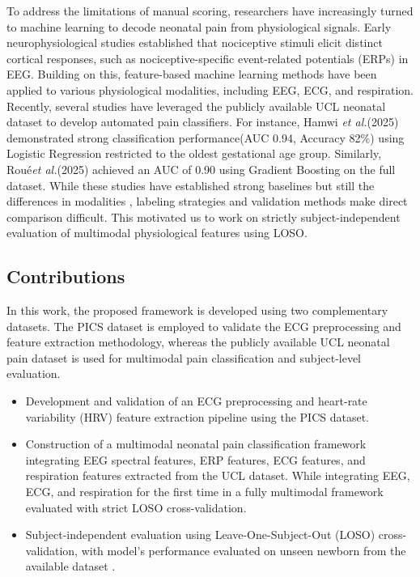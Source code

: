 \documentclass[conference]{IEEEtran}
\begin{document}
To address the limitations of manual scoring, researchers have increasingly turned to machine learning to decode neonatal pain from physiological signals. Early neurophysiological studies established that nociceptive stimuli elicit distinct cortical responses, such as nociceptive-specific event-related potentials (ERPs) in EEG. Building on this, feature-based machine learning methods have been applied to various physiological modalities, including EEG, ECG, and respiration.
Recently, several studies have leveraged the publicly available UCL neonatal dataset to develop automated pain classifiers. For instance, Hamwi \textit{et al.}(2025)\cite{hamwi2025eeg} demonstrated strong classification performance(AUC 0.94, Accuracy 82\%) using Logistic Regression restricted to the oldest gestational age group. Similarly, Roué\textit{et al.}(2025)\cite{roue2025objective} achieved an AUC of 0.90 using Gradient Boosting on the full dataset. While these studies have established strong baselines but still the differences in modalities , labeling strategies and validation methods make direct comparison difficult. This motivated us to work on strictly subject-independent evaluation of multimodal physiological features using LOSO.

\subsection{Contributions}
In this work, the proposed framework is developed using two complementary datasets. The PICS dataset is employed to validate the ECG preprocessing and feature extraction methodology, whereas the publicly available UCL neonatal pain dataset is used for multimodal pain classification and subject-level evaluation.
\begin{itemize}

\item Development and validation of an ECG preprocessing and heart-rate variability (HRV) feature extraction pipeline using the PICS dataset.

\item Construction of a multimodal neonatal pain classification framework integrating EEG spectral features, ERP features, ECG features, and respiration features extracted from the UCL dataset. While integrating EEG, ECG, and respiration for the first time in a fully multimodal framework evaluated with strict LOSO cross-validation.

\item Subject-independent evaluation using Leave-One-Subject-Out (LOSO) cross-validation, with model's performance evaluated on unseen newborn from the available dataset .


\end{itemize}
\end{document}
